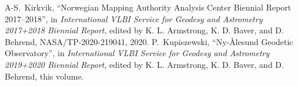 \documentclass[twocolumn,twoside]{svmultivs_br} %
\begin{document}
\begin{thebibliography}{99}

A-S.~Kirkvik, ``Norwegian Mapping Authority Analysis Center Biennial Report 2017--2018'',
in \emph{International VLBI Service for Geodesy and Astrometry 2017+2018 Biennial Report},
edited by K. L. Armstrong, K. D. Baver, and D. Behrend,
NASA/TP-2020-219041, 2020.
P.~Kupiszewski, ``Ny-\AA lesund Geodetic Observatory'',
in \emph{International VLBI Service for Geodesy and Astrometry 2019+2020 Biennial Report},
edited by K. L. Armstrong, K. D. Baver, and D. Behrend,
this volume.
\end{thebibliography}
%
\end{document}
